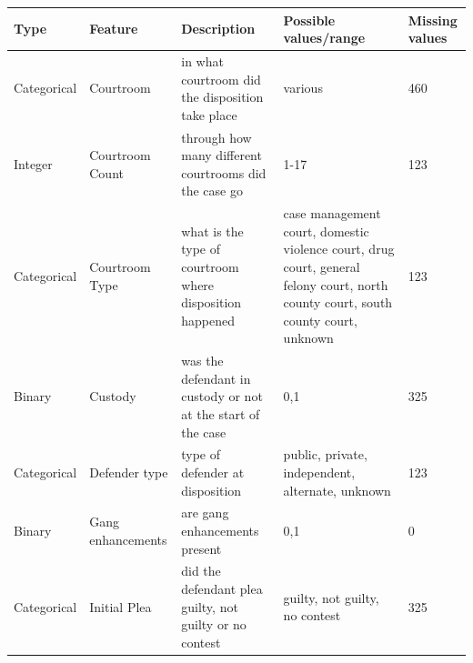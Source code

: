 \documentclass{AISB2008}
\begin{document}
\begin{table}
\centering
\tiny
\begin{tabular}{llp{8cm}p{5cm}l}
Type        & Feature              & Description                                                                                             & Possible values/range                                                                                                             & Missing values \\ \hline
Categorical & Courtroom            & in what courtroom did the disposition take place                                                        & various                                                                                                                           & 460            \\
Integer     & Courtroom Count      & through how many different courtrooms did the case go                                                   & 1-17                                                                                                                              & 123            \\
Categorical & Courtroom Type       & what is the type of courtroom where disposition happened                                                & case management court, domestic violence court, drug court, general felony court, north county court, south county court, unknown & 123            \\
Binary      & Custody              & was the defendant in custody or not at the start of the case                                            & 0,1                                                                                                                               & 325            \\
Categorical & Defender type        & type of defender at disposition                                                                         & public, private, independent, alternate, unknown                                                                                  & 123            \\
Binary      & Gang enhancements    & are gang enhancements present                                                                           & 0,1                                                                                                                               & 0              \\
Categorical & Initial Plea         & did the defendant plea guilty, not guilty or no contest                                                 & guilty, not guilty, no contest                                                                                                    & 325            \\

\end{tabular}
\end{table}
\end{document}
